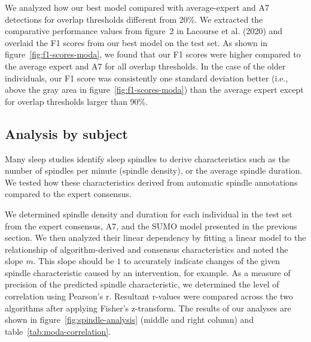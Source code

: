 \documentclass[fleqn,twocolumn,10pt]{wlscirep}
\begin{document}
We analyzed how our best model compared with average-expert and A7 detections
for overlap thresholds different from 20\%.  We extracted the comparative
performance values from figure~2 in Lacourse et al. (2020)\cite{Lacourse2020}
and overlaid the F1 scores from our best model on the test set.  As shown in
figure~\ref{fig:f1-scores-moda}, we found that our F1 scores were higher compared
to the average expert and A7 for all overlap thresholds.  In the case of the
older individuals, our F1 score was consistently one standard deviation better
(i.e., above the gray area in figure~\ref{fig:f1-scores-moda}) than the average
expert except for overlap thresholds larger than 90\%.

\subsection{Analysis by subject}

Many sleep studies identify sleep spindles to derive characteristics such as the
number of spindles per minute (spindle density), or the average spindle
duration.  We tested how these characteristics derived from automatic spindle
annotations compared to the expert consensus.

We determined spindle density and duration for each individual in the test set
from the expert consensus, A7, and the SUMO model presented
in the previous section.  We then analyzed their linear dependency by fitting a
linear model to the relationship of algorithm-derived and consensus
characteristics and noted the slope $m$.  This slope should be $1$ to accurately
indicate changes of the given spindle characteristic caused by an intervention,
for example.
As a measure of precision of the predicted spindle characteristic, we determined
the level of correlation using Pearson's r.  Resultant r-values were compared
across the two algorithms after applying Fisher's z-transform\cite{Fisher1921}.
The results of our analyses are shown in figure~\ref{fig:spindle-analysis} 
(middle and right column)
and table~\ref{tab:moda-correlation}.
\end{document}
